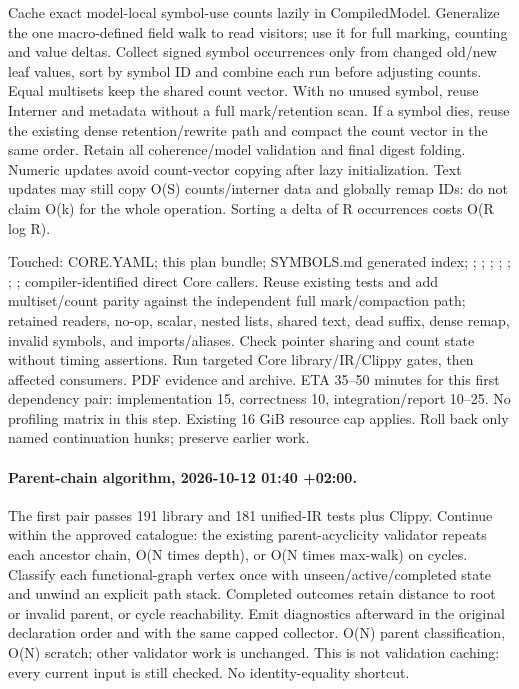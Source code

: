 \documentclass[11pt,a4paper]{article}
\begin{document}
Cache exact model-local symbol-use counts lazily in CompiledModel. Generalize
the one macro-defined field walk to read visitors; use it for full marking,
counting and value deltas. Collect signed symbol occurrences only from changed
old/new leaf values, sort by symbol ID and combine each run before adjusting
counts. Equal multisets keep the shared count vector. With no unused symbol,
reuse Interner and metadata without a full mark/retention scan. If a symbol dies,
reuse the existing dense retention/rewrite path and compact the count vector in
the same order. Retain all coherence/model validation and final digest folding.
Numeric updates avoid count-vector copying after lazy initialization. Text updates
may still copy O(S) counts/interner data and globally remap IDs: do not claim O(k)
for the whole operation. Sorting a delta of R occurrences costs O(R log R).

Touched: CORE.YAML; this plan bundle; SYMBOLS.md generated index;
; ;
; ;
; ;
; compiler-identified
direct Core callers. Reuse existing tests and add multiset/count parity against
the independent full mark/compaction path; retained readers, no-op, scalar, nested
lists, shared text, dead suffix, dense remap, invalid symbols, and imports/aliases.
Check pointer sharing and count state without timing assertions. Run targeted
Core library/IR/Clippy gates, then affected consumers. PDF evidence and archive.
ETA 35--50 minutes for this first dependency pair: implementation 15, correctness
10, integration/report 10--25. No profiling matrix in this step. Existing 16 GiB
resource cap applies. Roll back only named continuation hunks; preserve earlier work.

\paragraph{Parent-chain algorithm, 2026-10-12 01:40 +02:00.}
The first pair passes 191 library and 181 unified-IR tests plus Clippy. Continue
within the approved catalogue: the existing parent-acyclicity validator repeats
each ancestor chain, O(N times depth), or O(N times max-walk) on cycles. Classify
each functional-graph vertex once with unseen/active/completed state and unwind
an explicit path stack. Completed outcomes retain distance to root or invalid
parent, or cycle reachability. Emit diagnostics afterward in the original
declaration order and with the same capped collector. O(N) parent classification,
O(N) scratch; other validator work is unchanged. This is not validation caching:
every current input is still checked. No identity-equality shortcut.
\end{document}
